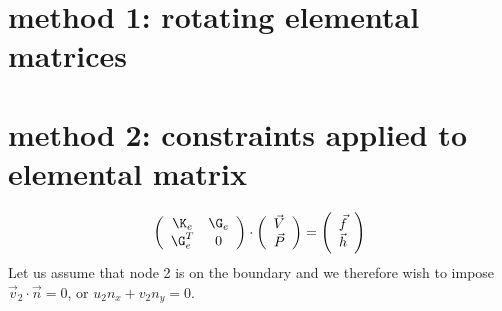\section*{method 1: rotating elemental matrices}

\section*{method 2: constraints applied to elemental matrix}

\[
\left(
\begin{array}{cc}
\K_e & \G_e \\
\G_e^T & 0
\end{array}
\right)
\cdot
\left(
\begin{array}{c}
\vec{V} \\
\vec{P}
\end{array}
\right)
=\left(
\begin{array}{c}
\vec{f} \\ \vec{h}
\end{array}
\right)
\]
Let us assume that node 2 is on the boundary and we therefore wish to 
impose $\vec{v}_2\cdot \vec{n}=0$, or $u_2 n_x + v_2 n_y =0$.

